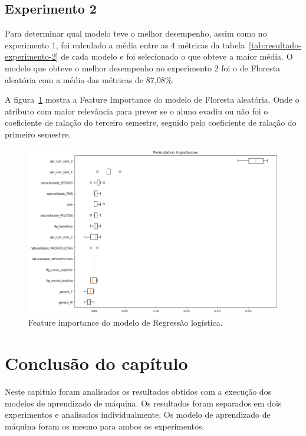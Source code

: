 \documentclass[diss,capa]{texufpel}
\begin{document}
\subsection{Experimento 2}

Para determinar qual modelo teve o melhor desempenho, assim como no experimento 1, foi calculado a média entre as 4 métricas da tabela~\ref{tab:resultado-experimento-2} de cada modelo e foi selecionado o que obteve a maior média.
O modelo que obteve o melhor desempenho no experimento 2 foi o de Floresta aleatória com a média das métricas de 87,08\%.

A figura~\ref{fig:e2-feature-importance-rf} mostra a Feature Importance do modelo de Floresta aleatória.
Onde o atributo com maior relevância para prever se o aluno evadiu ou não foi o coeficiente de ralação do terceiro semestre, seguido pelo coeficiente de ralação do primeiro semestre.

\begin{figure}[htbp]
\centering
\includegraphics[scale=.53]{imagens/e2-feature-importance-rf.png}
\caption{Feature importance do modelo de Regressão logística.}
\label{fig:e2-feature-importance-rf}
\end{figure}

\section{Conclusão do capítulo}

Neste capitulo foram analisados os resultados obtidos com a execução dos modelos de aprendizado de máquina.
Os resultados foram separados em dois experimentos e analisados individualmente.
Os modelo de aprendizado de máquina foram os mesmo para ambos os experimentos.
\end{document}
